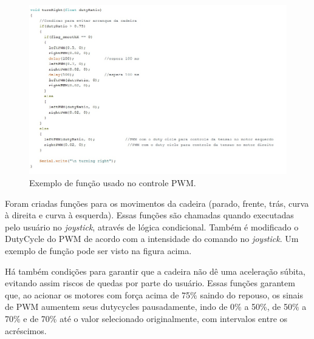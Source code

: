 \begin{figure}[h!]
  \centering
  \includegraphics[width=1.0\textwidth]{figuras/Funcoes.jpg}
  \caption{Exemplo de função usado no controle PWM.}
    \label{fig:funcoes}
\end{figure}

Foram criadas funções para os movimentos da cadeira (parado, frente, trás,
curva à direita e curva à esquerda). Essas funções são chamadas quando
executadas pelo usuário no \textit{joystick}, através de lógica condicional.
Também é modificado o DutyCycle do PWM de acordo com a intensidade do comando no
\textit{joystick}. Um exemplo de função pode ser visto na figura acima.

Há também condições para garantir que a cadeira não dê uma aceleração súbita,
evitando assim riscos de quedas por parte do usuário. Essas funções garantem
que, ao acionar os motores com força acima de 75\% saindo do repouso, os sinais
de PWM aumentem seus dutycycles pausadamente, indo de 0\% a 50\%, de 50\% a
70\% e de 70\% até o valor selecionado originalmente, com intervalos entre os acréscimos.
